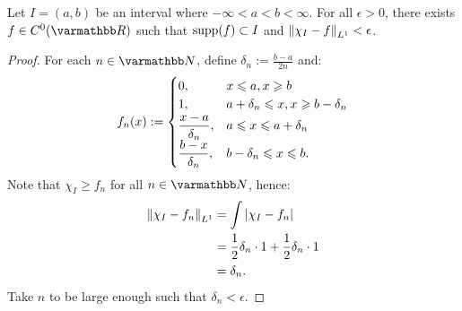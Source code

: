 \begin{lemma}\label{lemma:cont-funct-with-compact-supp-approximates-indicator-funct-on-open-int}
    Let $I = (a,b)$ be an interval where $-\infty < a < b < \infty$. For all $\epsilon > 0$, there exists $f \in C^0(\bfR)$ such that $\operatorname{supp}(f) \subset I$ and $\left\lVert \chi_I - f \right\rVert_{L^1} < \epsilon$.
\end{lemma}
    \begin{proof}
        For each $n \in \bfN$, define $\delta_n := \frac{b-a}{2n}$ and:
            \begin{equation*}
            \begin{split}
                f_n(x) := 
                \begin{cases}
                    0, & x \leqslant a, x \geqslant b \\
                    1, & a+\delta_n \leqslant x, x \geqslant b - \delta_n \\
                    \displaystyle\frac{x-a}{\delta_n}, & a \leqslant x \leqslant a+\delta_n \\
                    \displaystyle\frac{b-x}{\delta_n}, & b - \delta_n \leqslant x \leqslant b.
                \end{cases}
            \end{split}
            \end{equation*}
        Note that $\chi_I \geq f_n$ for all $n \in \bfN$, hence:
            \begin{equation*}
            \begin{split}
                \left\lVert \chi_I - f_n \right\rVert_{L^1} 
                & = \int |\chi_I - f_n| \\
                & = \frac{1}{2}\delta_n\cdot1 + \frac{1}{2} \delta_n\cdot1 \\
                & = \delta_n.
            \end{split}
            \end{equation*}
        Take $n$ to be large enough such that $\delta_n < \epsilon$.
    \end{proof}

